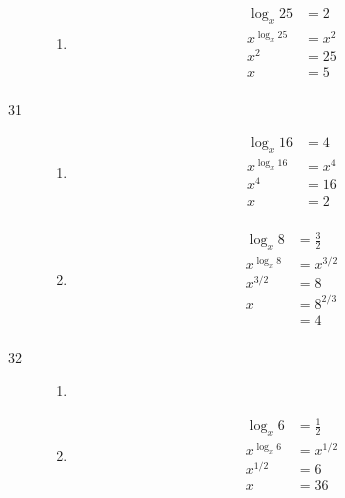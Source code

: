 \documentclass{exam}
\begin{document}
\begin{description}
\begin{enumerate}[a]
        \item 
          \begin{align*}
            \log_x 25     &= 2 \\
            x^{\log_x 25} &= x^2 \\
            x^2           &= 25 \\
            x             &= 5 \\
          \end{align*}
      \end{enumerate}

    \item[31]
      \begin{enumerate}[a]
        \item 
          \begin{align*}
            \log_x 16     &= 4 \\
            x^{\log_x 16} &= x^4 \\
            x^4           &= 16 \\
            x             &= 2 \\
          \end{align*}

        \item 
          \begin{align*}
            \log_x 8     &= \frac{3}{2} \\
            x^{\log_x 8} &= x^{3/2} \\
            x^{3/2}      &= 8 \\
            x            &= 8^{2/3} \\
                         &= 4 \\
          \end{align*}
      \end{enumerate}

    \item[32]
      \begin{enumerate}[a]
        \item 
        \item 
          \begin{align*}
            \log_x 6     &= \frac{1}{2} \\
            x^{\log_x 6} &= x^{1/2} \\
            x^{1/2}      &= 6 \\
            x            &= 36 \\
          \end{align*}


\end{enumerate}
\end{description}
\end{document}
